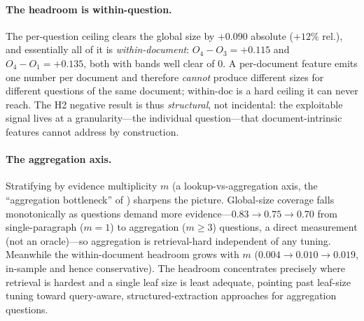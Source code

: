 \documentclass[11pt]{article}
\begin{document}
\paragraph{The headroom is within-question.} The per-question ceiling clears the
global size by $+0.090$ absolute ($+12\%$ rel.), and essentially all of it is
\emph{within-document}: $O_4-O_3=+0.115$ and $O_4-O_1=+0.135$, both with bands well
clear of $0$. A per-document feature emits one number per document and therefore
\emph{cannot} produce different sizes for different questions of the same document;
$\mathrm{within\text{-}doc}$ is a hard ceiling it can never reach. The H2 negative
result is thus \emph{structural}, not incidental: the exploitable signal lives at a
granularity---the individual question---that document-intrinsic features cannot
address by construction.

\paragraph{The aggregation axis.} Stratifying by evidence multiplicity $m$ (a
lookup-vs-aggregation axis, the ``aggregation bottleneck'' of \cite{sliders2026})
sharpens the picture. Global-size coverage falls monotonically as questions demand
more evidence---$0.83 \to 0.75 \to 0.70$ from single-paragraph ($m{=}1$) to
aggregation ($m{\ge}3$) questions, a direct measurement (not an oracle)---so
aggregation is retrieval-hard independent of any tuning. Meanwhile the
within-document headroom grows with $m$ ($0.004 \to 0.010 \to 0.019$, in-sample and
hence conservative). The headroom concentrates precisely where retrieval is hardest
and a single leaf size is least adequate, pointing past leaf-size tuning toward
query-aware, structured-extraction approaches for aggregation questions.
\end{document}
